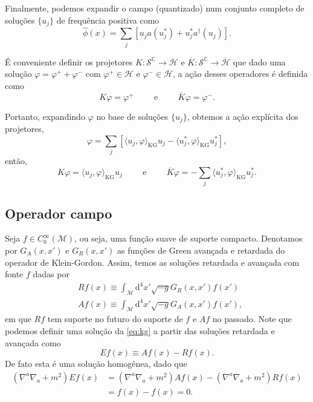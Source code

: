 \documentclass[12pt]{article}
\newcommand{\m}{\mathcal{M}}
\newcommand{\s}{\mathcal{S}}
\newcommand{\kg}{\left(\nabla^a\nabla_a+m^2\right)}
\newcommand{\dd}{\mathrm{d}}
\newcommand{\innerkg}[2]{\langle#1,#2\rangle_{\text{KG}}}
\newcommand{\h}{\mathcal{H}}
\begin{document}
Finalmente, podemos expandir o campo (quantizado) num conjunto completo de soluções \(\{u_j\}\) de frequência positiva como
\begin{equation}
    \hat{\phi}(x)=\sum_j\left[u_ja(u_j ^*)+u_j^*a^{\dagger}(u_j)\right].
\end{equation}

É conveniente definir os projetores \(K:\s^{\mathbb{C}}\to\h\) e \(\overline{K}:\s^\mathbb{C}\to\overline{\h}\) que dado uma solução \(\varphi=\varphi^++\varphi^-\) com \(\varphi^+\in\h\) e \(\varphi^-\in\overline{\h}\), a ação desses operadores é definida como
\begin{equation}
    K\varphi=\varphi^+\hspace{1cm}\text{e}\hspace{1cm}\overline{K}\varphi=\varphi^-.
\end{equation}

Portanto, expandindo \(\varphi\) no base de soluções \(\{u_j\}\), obtemos a ação explícita dos projetores,
\begin{equation}
    \varphi=\sum_j\left[\innerkg{u_j}{\varphi}u_j-\innerkg{u_j^*}{\varphi}u_j^*\right],
\end{equation}
então,
\begin{equation}
    K\varphi=\innerkg{u_j}{\varphi}u_j\hspace{1cm}\text{e}\hspace{1cm}\overline{K}\varphi=-\sum_j\innerkg{u_j^*}{\varphi}u_j^*.
\end{equation}

\subsection*{Operador campo}
Seja \(f\in C_0^{\infty}(\m)\), ou seja, uma função suave de suporte compacto. Denotamos por \(G_A(x,x')\) e \(G_R(x,x')\) as funções de Green avançada e retardada do operador de Klein-Gordon. Assim, temos as soluções retardada e avançada com fonte \(f\) dadas por
\begin{subequations}
    \begin{align}
        &Rf(x)\equiv\int_\m\dd^4x'\sqrt{-g}G_R(x,x')f(x')\\
        &Af(x)\equiv\int_\m\dd^4x'\sqrt{-g}G_A(x,x')f(x'),
    \end{align}
\end{subequations}
em que \(Rf\) tem suporte no futuro do suporte de \(f\) e \(Af\) no passado. Note que podemos definir uma solução da \cref{eq:kg} a partir das soluções retardada e avançada como
\begin{equation}
    Ef(x)\equiv Af(x)-Rf(x).
\end{equation}
De fato esta é uma solução homogênea, dado que
\begin{subequations}
    \begin{align}
        \kg Ef(x)&=\kg Af(x)-\kg Rf(x)\\
        &=f(x)-f(x)=0.
    \end{align}
\end{subequations}
\end{document}
